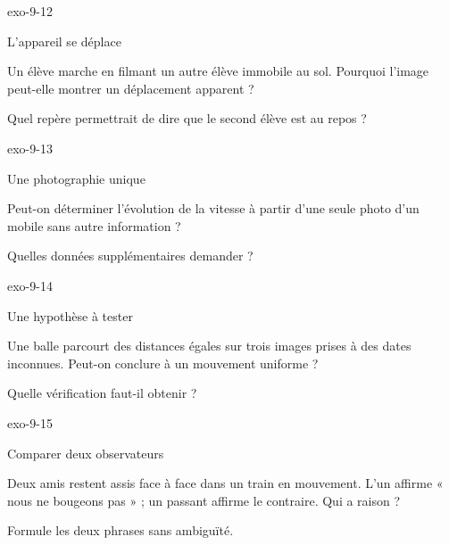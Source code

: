 \documentclass[12pt,twoside,openany]{book}
\begin{document}
\begin{blocLivre}{exo-9-12}
\begin{exercice}[3]{L’appareil se déplace}
\begin{questions}
\item Un élève marche en filmant un autre élève immobile au sol. Pourquoi l’image peut-elle montrer un déplacement apparent ?
\item Quel repère permettrait de dire que le second élève est au repos ?
\end{questions}
\end{exercice}\end{blocLivre}
\begin{blocLivre}{exo-9-13}
\begin{exercice}[3]{Une photographie unique}
\begin{questions}
\item Peut-on déterminer l’évolution de la vitesse à partir d’une seule photo d’un mobile sans autre information ?
\item Quelles données supplémentaires demander ?
\end{questions}
\end{exercice}\end{blocLivre}
\begin{blocLivre}{exo-9-14}
\begin{exercice}[3]{Une hypothèse à tester}
\begin{questions}
\item Une balle parcourt des distances égales sur trois images prises à des dates inconnues. Peut-on conclure à un mouvement uniforme ?
\item Quelle vérification faut-il obtenir ?
\end{questions}
\end{exercice}\end{blocLivre}
\begin{blocLivre}{exo-9-15}
\begin{exercice}[3]{Comparer deux observateurs}
\begin{questions}
\item Deux amis restent assis face à face dans un train en mouvement. L’un affirme « nous ne bougeons pas » ; un passant affirme le contraire. Qui a raison ?
\item Formule les deux phrases sans ambiguïté.
\end{questions}
\end{exercice}\end{blocLivre}
\end{document}
